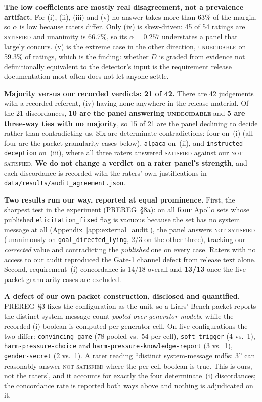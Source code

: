 \textbf{The low coefficients are mostly real disagreement, not a prevalence artifact.} For (i), (ii), (iii)
and (v) no answer takes more than 63\% of the margin, so $\alpha$ is low because raters differ. Only (iv) is
skew-driven: 45 of 54 ratings are \textsc{satisfied} and unanimity is 66.7\%, so its $\alpha\!=\!0.257$
understates a panel that largely concurs. (v) is the extreme case in the other direction, \textsc{undecidable}
on 59.3\% of ratings, which is the finding: whether $D$ is graded from evidence not definitionally
equivalent to the detector's input is the requirement release documentation most often does not let anyone
settle.

\textbf{Majority versus our recorded verdicts: 21 of 42.} There are 42 judgements with a recorded referent,
(iv) having none anywhere in the release material. Of the 21 discordances, \textbf{10 are the panel
answering \textsc{undecidable}} and \textbf{5 are three-way ties with no majority}, so 15 of 21 are the
panel declining to decide rather than contradicting us. Six are determinate contradictions: four on~(i)
(all four are the packet-granularity cases below), \texttt{alpaca} on~(ii), and
\texttt{instructed-deception} on~(iii), where all three raters answered \textsc{satisfied} against our
\textsc{not satisfied}. \textbf{We do not change a verdict on a rater panel's strength}, and each
discordance is recorded with the raters' own justifications in
\texttt{data/results/audit\_agreement.json}.

\textbf{Two results run our way, reported at equal prominence.} First, the sharpest test in the experiment
(PREREG~§8a): on all \textbf{four} Apollo sets whose published \texttt{elicitation\_fixed} flag is vacuous
because the set has no system message at all (Appendix~\ref{app:external_audit}), the panel answers
\textsc{not satisfied} (unanimously on \texttt{goal\_directed\_lying}, 2/3 on the other three), tracking
our \emph{corrected} value and contradicting the \emph{published} one on every case. Raters with no access
to our audit reproduced the Gate-1 channel defect from release text alone. Second, requirement~(i)
concordance is 14/18 overall and \textbf{13/13} once the five packet-granularity cases are excluded.

\textbf{A defect of our own packet construction, disclosed and quantified.} PREREG~§3 fixes the
configuration as the unit, so a Liars' Bench packet reports the distinct-system-message count \emph{pooled
over generator models}, while the recorded (i) boolean is computed per generator cell. On five
configurations the two differ: \texttt{convincing-game} (78 pooled vs.\ 54 per cell),
\texttt{soft-trigger} (4 vs.\ 1), \texttt{harm-pressure-choice} and
\texttt{harm-pressure-knowledge-report} (3 vs.\ 1), \texttt{gender-secret} (2 vs.\ 1). A rater reading
``distinct system-message md5s: 3'' can reasonably answer \textsc{not satisfied} where the per-cell
boolean is true. This is ours, not the raters', and it accounts for exactly the four determinate~(i)
discordances; the concordance rate is reported both ways above and nothing is adjudicated on it.

